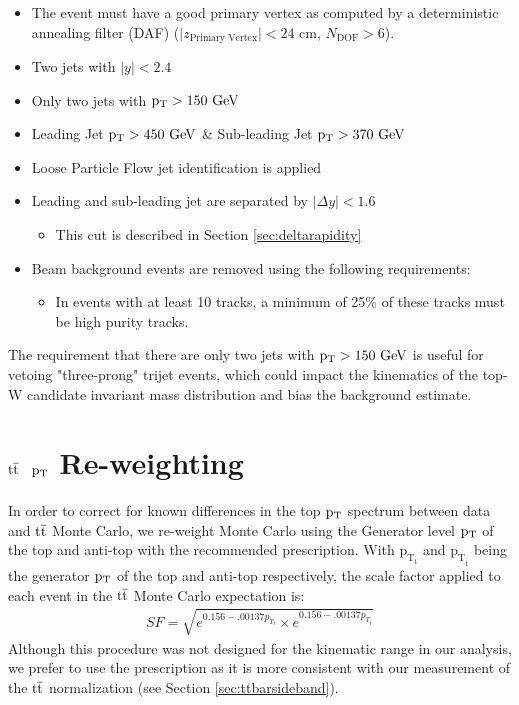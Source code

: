\begin{itemize}
\item The event must have a good primary vertex as computed by a deterministic annealing filter (DAF)
($\vert z_\text{Primary Vertex}\vert < 24$ cm, $N_\text{DOF} > 6$).
\item Two jets with $|y| < 2.4$
\item Only two jets with $\mathrm{p_{T}} > 150~\mathrm{GeV}$
\item Leading Jet $\mathrm{p_{T}} > 450~\mathrm{GeV}$ \& Sub-leading Jet $\mathrm{p_{T}} > 370~\mathrm{GeV}$
\item Loose Particle Flow jet identification \cite{jetid} is applied
\item Leading and sub-leading jet are separated by $|\Delta y| < 1.6$
	\begin{itemize}
	\item This cut is described in Section \ref{sec:deltarapidity}
	\end{itemize}
\item Beam background events are removed using the following requirements:
        \begin{itemize}
        \item In events with at least 10 tracks, a minimum of 25\% of
          these tracks must be high purity tracks.
        \end{itemize}
\end{itemize}


The requirement that there are only two jets with $\mathrm{p_{T}} > 150~\mathrm{GeV}$ is useful for vetoing "three-prong" trijet events, which could impact the kinematics of the top-W candidate invariant mass 
distribution and bias the background estimate. 

\section{$\mathrm{t\overline{t}}$ $\mathrm{p_{T}}$ Re-weighting}
\label{sec:ttptrw}
In order to correct for known differences in the top $\mathrm{p_{T}}$ spectrum between data and $\mathrm{t\overline{t}}$ Monte Carlo, we re-weight Monte Carlo using the Generator level $\mathrm{p_{T}}$ of the top and anti-top with the recommended prescription.  
With $\mathrm{p_{T_{t}}}$ and $\mathrm{p_{T_{\overline{t}}}}$ being the generator $\mathrm{p_{T}}$ of the top and anti-top respectively, the scale factor applied to each event in the $\mathrm{t\overline{t}}$ Monte Carlo expectation is:
\begin{eqnarray}
SF =\sqrt{e^{0.156-.00137p_{T_{t}}} \times e^{0.156-.00137p_{T_{\overline{t}}}}}
\end{eqnarray}
Although this procedure was not designed for the kinematic range in our analysis, we prefer to use the prescription as it is more consistent with our measurement of the $\mathrm{t\overline{t}}$ normalization (see Section \ref{sec:ttbarsideband}).



